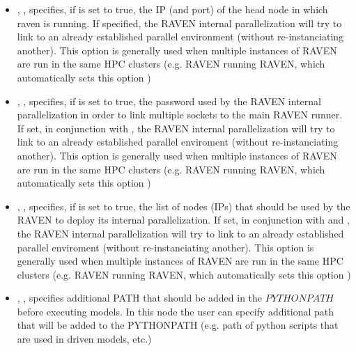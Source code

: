 \begin{itemize}
\item {}, , specifies, if  is set to true, the IP (and port) of the head node
in which raven is running. If specified, the RAVEN internal parallelization will try to link
to an already established parallel environment (without re-instanciating another).
\nb This option is generally used when multiple instances of RAVEN are run in the same HPC clusters (e.g. RAVEN running RAVEN, which
automatically sets this option )
%

\item {}, , specifies, if  is set to true, the password used by the RAVEN internal parallelization
in order to link multiple sockets to the main RAVEN runner. If set, in conjunction with  ,  the RAVEN internal parallelization will try to link
to an already established parallel enviroment (without re-instanciating another).
\nb This option is generally used when multiple instances of RAVEN are run in the same HPC clusters (e.g. RAVEN running RAVEN, which
automatically sets this option )
%

\item {}, , specifies, if  is set to true, the list of nodes (IPs) that should be used by the RAVEN to deploy its internal parallelization.
If set, in conjunction with   and ,  the RAVEN internal parallelization will try to link
to an already established parallel enviroment (without re-instanciating another).
\nb This option is generally used when multiple instances of RAVEN are run in the same HPC clusters (e.g. RAVEN running RAVEN, which
automatically sets this option )
%


\item {}, , specifies additional PATH that should be added in the $PYTHONPATH$ before executing models. In this node the user can specify
additional path that will be added to the PYTHONPATH (e.g. path of python scripts that are used in driven models, etc.)
%

\end{itemize}

